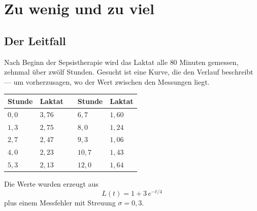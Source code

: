 \chapter{Zu wenig und zu viel}

\section{Der Leitfall}

\begin{merksatz}
Nach Beginn der Sepsistherapie wird das Laktat alle $80$ Minuten gemessen, zehnmal über zwölf Stunden. Gesucht ist eine Kurve, die den Verlauf beschreibt --- um vorherzusagen, wo der Wert zwischen den Messungen liegt.

\begin{center}
{\small
\renewcommand{\arraystretch}{1.36}
\begin{tabular}{@{}P{1.5cm}P{1.4cm}P{0.6cm}P{1.5cm}P{1.4cm}@{}}
\toprule
\textbf{Stunde} & \textbf{Laktat} & & \textbf{Stunde} & \textbf{Laktat}\\
\midrule
$0{,}0$ & $3{,}76$ & & $6{,}7$ & $1{,}60$\\
$1{,}3$ & $2{,}75$ & & $8{,}0$ & $1{,}24$\\
$2{,}7$ & $2{,}47$ & & $9{,}3$ & $1{,}06$\\
$4{,}0$ & $2{,}23$ & & $10{,}7$ & $1{,}43$\\
$5{,}3$ & $2{,}13$ & & $12{,}0$ & $1{,}64$\\
\bottomrule
\end{tabular}}
\end{center}

Die Werte wurden erzeugt aus
\[ L(t) = 1 + 3\,e^{-t/4} \]
plus einem Messfehler mit Streuung $\sigma = 0{,}3$.

\begin{center}
\begin{minipage}{0.88\textwidth}
\end{minipage}
\end{center}
\end{merksatz}

